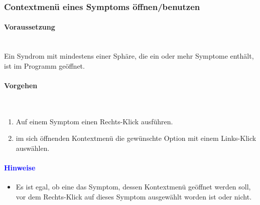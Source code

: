 \documentclass[enabledeprecatedfontcommands,fontsize=11pt,paper=a4,twoside]{scrartcl}
\newcommand*{\hint}{\paragraph{\textcolor{blue}{Hinweise}}}
\newcommand*{\condition}{\paragraph{Voraussetzung}$\;$ \vspace{0.2cm}\\}
\newcommand*{\actions}{\paragraph{Vorgehen} $\;$\vspace{0.2cm}\\}
\begin{document}
				\newpage	
		\subsubsection{Contextmenü eines Symptoms öffnen/benutzen}
				\condition 	
		Ein Syndrom mit mindestens einer Sphäre, die ein oder mehr Symptome enthält, ist im Programm geöffnet. 
		\actions  
		\begin{enumerate}
			\item Auf einem Symptom einen Rechts-Klick ausführen.
			\item im sich öffnenden Kontextmenü die gewünschte Option mit einem Links-Klick auswählen.
		\end{enumerate}
		\hint
		\begin{itemize}
			\item Es ist egal, ob eine das Symptom, dessen Kontextmenü geöffnet werden soll, vor dem Rechts-Klick auf dieses Symptom ausgewählt worden ist oder nicht.
		\end{itemize}
		
				\newpage	
\end{document}
